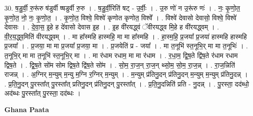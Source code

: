 \documentclass[17pt]{extarticle}
\begin{document}
30. ष॒डु॒र्वी॒ रु॒रू॑रु ष॑डुर्वी ष्षडुर्वी रु॒रु । . ष॒डु॒र्वी॒रिति॑ षट् - उ॒र्वीः॒ । . उ॒रु णो॑ न उ॒रू॑रु णः॑ । . नः॒ कृ॒णो॒त॒ कृ॒णो॒त॒ नो॒ नः॒ कृ॒णो॒त॒ । . कृ॒णो॒त॒ विश्वे॒ विश्वे॑ कृणोत कृणोत॒ विश्वे᳚ । . विश्वे॑ देवासो देवासो॒ विश्वे॒ विश्वे॑ देवासः । . दे॒वा॒स॒ इ॒हे ह दे॑वासो देवास इ॒ह । . इ॒ह वी॑रयद्ध्वं ॅवीरयद्ध्व मि॒हे ह वी॑रयद्ध्वम् । . वी॒र॒य॒द्ध्व॒मिति॑ वीरयद्ध्वम् । . मा हा᳚स्महि हास्महि॒ मा मा हा᳚स्महि । . हा॒स्म॒हि॒ प्र॒जया᳚ प्र॒जया॑ हास्महि हास्महि प्र॒जया᳚ । . प्र॒जया॒ मा मा प्र॒जया᳚ प्र॒जया॒ मा । . प्र॒जयेति॑ प्र - जया᳚ । . मा त॒नूभि॑ स्त॒नूभि॒र् मा मा त॒नूभिः॑ । . त॒नूभि॒र् मा मा त॒नूभि॑ स्त॒नूभि॒र् मा । . मा र॑धाम रधाम॒ मा मा र॑धाम । . र॒धा॒म॒ द्वि॒ष॒ते द्वि॑ष॒ते र॑धाम रधाम द्विष॒ते । . द्वि॒ष॒ते सो॑म सोम द्विष॒ते द्वि॑ष॒ते सो॑म । . सो॒म॒ रा॒ज॒न् रा॒ज॒न् थ्सो॒म॒ सो॒म॒ रा॒ज॒न्न् । . रा॒ज॒न्निति॑ राजन्न् । . अ॒ग्निर् म॒न्युम् म॒न्यु म॒ग्नि र॒ग्निर् म॒न्युम् । . म॒न्युम् प्र॑तिनु॒दन् प्र॑तिनु॒दन् म॒न्युम् म॒न्युम् प्र॑तिनु॒दन्न् । . प्र॒ति॒नु॒दन् पु॒रस्ता᳚त् पु॒रस्ता᳚त् प्रतिनु॒दन् प्र॑तिनु॒दन् पु॒रस्ता᳚त् । . प्र॒ति॒नु॒दन्निति॑ प्रति - नु॒दन्न् । . पु॒रस्ता॒ दद॑ब्धो॒ अद॑ब्धः पु॒रस्ता᳚त् पु॒रस्ता॒ दद॑ब्धः । \newline

\textbf{Ghana Paata } \newline
\end{document}
